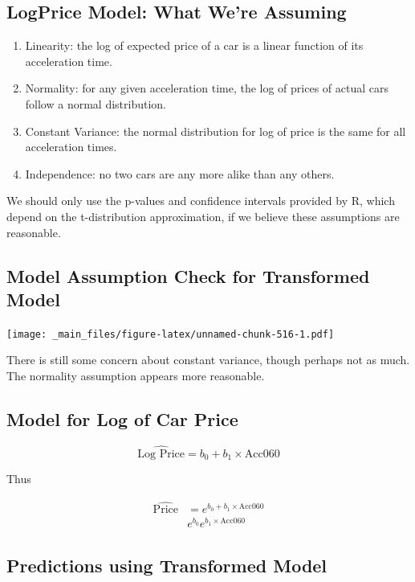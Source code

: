 \documentclass[]{book}
\begin{document}
\subsection{LogPrice Model: What We're
Assuming}\label{logprice-model-what-were-assuming}

\begin{enumerate}
\def\labelenumi{\arabic{enumi}.}
\item
  Linearity: the log of expected price of a car is a linear function of
  its acceleration time.
\item
  Normality: for any given acceleration time, the log of prices of
  actual cars follow a normal distribution.
\item
  Constant Variance: the normal distribution for log of price is the
  same for all acceleration times.
\item
  Independence: no two cars are any more alike than any others.
\end{enumerate}

We should only use the p-values and confidence intervals provided by R,
which depend on the t-distribution approximation, if we believe these
assumptions are reasonable.

\subsection{Model Assumption Check for Transformed
Model}\label{model-assumption-check-for-transformed-model}

\texttt{[image: \_main\_files/figure-latex/unnamed-chunk-516-1.pdf]}

There is still some concern about constant variance, though perhaps not
as much. The normality assumption appears more reasonable.

\subsection{Model for Log of Car
Price}\label{model-for-log-of-car-price}

\[
\widehat{\text{Log Price}} = b_0 + b_1\times \text{Acc060} 
\]

Thus

\[
\begin{aligned}
\widehat{\text{Price}} & = e^{b_0 + b_1\times \text{Acc060} } \\
 & e^{b_0}e^{b_1 \times \text{Acc060}}
\end{aligned}
\]

\subsection{Predictions using Transformed
Model}\label{predictions-using-transformed-model}
\end{document}
